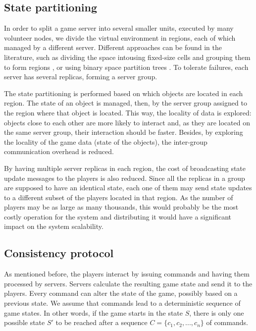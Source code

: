 \documentclass[]{usiinfprospectus}
\begin{document}
\subsection{State partitioning} \label{sec:statepart}

In order to split a game server into several smaller units, executed by many volunteer nodes, we divide the virtual environment in regions, each of which managed by a different server. Different approaches can be found in the literature, such as dividing the space intousing fixed-size cells and grouping them to form regions \cite{devleeschauwer2005dma}, or using binary space partition trees \cite{bezerra2009fgl}. To tolerate failures, each server has several replicas, forming a server group.

The state partitioning is performed based on which objects are located in each region. The state of an object is managed, then, by the server group assigned to the region where that object is located. This way, the locality of data is explored: objects close to each other are more likely to interact and, as they are located on the same server group, their interaction should be faster. Besides, by exploring the locality of the game data (state of the objects), the inter-group communication overhead is reduced.

By having multiple server replicas in each region, the cost of broadcasting state update messages to the players is also reduced. Since all the replicas in a group are supposed to have an identical state, each one of them may send state updates to a different subset of the players located in that region. As the number of players may be as large as many thousands, this would probably be the most costly operation for the system and distributing it would have a significant impact on the system scalability.

\subsection{Consistency protocol} \label{sec:consprot}

As mentioned before, the players interact by issuing commands and having them processed by servers. Servers calculate the resulting game state and send it to the players. Every command can alter the state of the game, possibly based on a previous state. We assume that commands lead to a deterministic sequence of game states. In other words, if the game starts in the state $S$, there is only one possible state $S'$ to be reached after a sequence $C=\{c_{1}, c_{2}, ..., c_{n}\}$ of commands.
\end{document}
